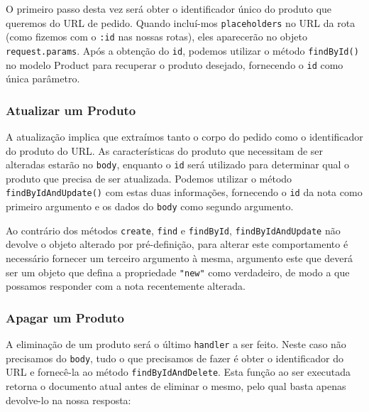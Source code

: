 O primeiro passo desta vez será obter o identificador único do produto que queremos do URL de pedido. Quando incluí-mos \texttt{placeholders} no URL da rota (como fizemos com o \texttt{:id} nas nossas rotas), eles aparecerão no objeto \texttt{request.params}. Após a obtenção do \texttt{id}, podemos utilizar o método \texttt{findById()} no modelo Product para recuperar o produto desejado, fornecendo o \texttt{id} como única parâmetro.



\subsubsection{Atualizar um Produto}

A atualização implica que extraímos tanto o corpo do pedido como o identificador do produto do URL. As características do produto que necessitam de ser alteradas estarão no \texttt{body}, enquanto o \texttt{id} será utilizado para determinar qual o produto que precisa de ser atualizada. Podemos utilizar o método \texttt{findByIdAndUpdate()} com estas duas informações, fornecendo o \texttt{id} da nota como primeiro argumento e os dados do \texttt{body} como segundo argumento.

Ao contrário dos métodos \texttt{create}, \texttt{find} e \texttt{findById}, \texttt{findByIdAndUpdate} não devolve o objeto alterado por pré-definição, para alterar este comportamento é necessário fornecer um terceiro argumento à mesma, argumento este que deverá ser um objeto que defina a propriedade \texttt{"new"} como verdadeiro, de modo a que possamos responder com a nota recentemente alterada.



\subsubsection{Apagar um Produto}

A eliminação de um produto será o último \texttt{handler} a ser feito. Neste caso não precisamos do \texttt{body}, tudo o que precisamos de fazer é obter o identificador do URL e fornecê-la ao método \texttt{findByIdAndDelete}. Esta função ao ser executada retorna o documento atual antes de eliminar o mesmo, pelo qual basta apenas devolve-lo na nossa resposta:

